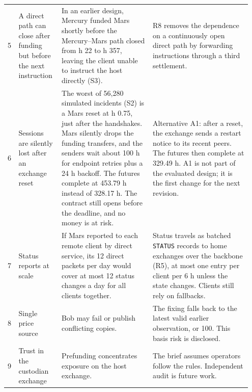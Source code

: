\documentclass[10pt,letterpaper]{article}
\makeatletter
\renewcommand\section{\@startsection{section}{1}{\z@}{-9pt plus -2pt minus -1pt}{3pt}{\normalfont\large\bfseries}}
\makeatother
\begin{document}
\begin{longtable}{@{}p{0.03\linewidth}p{0.17\linewidth}p{0.36\linewidth}p{0.39\linewidth}@{}}
5 & A direct path can close after funding but before the next instruction
& In an earlier design, Mercury funded Mars shortly before the Mercury--Mars path closed from h 22 to h 357, leaving the client unable to instruct the host directly (S3).
& R8 removes the dependence on a continuously open direct path by forwarding instructions through a third settlement. \\

6 & Sessions are silently lost after an exchange reset
& The worst of 56,280 simulated incidents (S2) is a Mars reset at h 0.75, just after the handshakes. Mars silently drops the funding transfers, and the senders wait about 100 h for endpoint retries plus a 24 h backoff. The futures complete at 453.79 h instead of 328.17 h. The contract still opens before the deadline, and no money is at risk.
& Alternative A1: after a reset, the exchange sends a restart notice to its recent peers. The futures then complete at 329.49 h. A1 is not part of the evaluated design; it is the first change for the next revision. \\

7 & Status reports at scale
& If Mars reported to each remote client by direct service, its 12 direct packets per day would cover at most 12 status changes a day for all clients together.
& Status travels as batched \texttt{STATUS} records to home exchanges over the backbone (R5), at most one entry per client per 6 h unless the state changes. Clients still rely on fallbacks. \\

8 & Single price source
& Bob may fail or publish conflicting copies.
& The fixing falls back to the latest valid earlier observation, or 100. This basis risk is disclosed. \\

9 & Trust in the custodian exchange
& Prefunding concentrates exposure on the host exchange.
& The brief assumes operators follow the rules. Independent audit is future work. \\

\end{longtable}


\section{Long-term operation}\label{sec:long}
\end{document}
